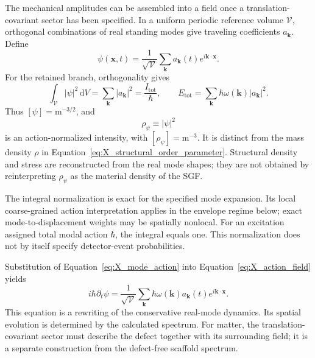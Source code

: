 The mechanical amplitudes can be assembled into a field once a translation-covariant sector has been specified. In a uniform periodic reference volume $\mathcal V$, orthogonal combinations of real standing modes give traveling coefficients $a_{\mathbf k}$. Define
\begin{equation}
    \boxed{
    \psi(\mathbf x,t)
    =\frac{1}{\sqrt{\mathcal V}}
    \sum_{\mathbf k}a_{\mathbf k}(t)e^{i\mathbf k\cdot\mathbf x}
    }.
    \label{eq:X_action_field}
\end{equation}
For the retained branch, orthogonality gives
\begin{equation}
    \int_{\mathcal V}|\psi|^2\,\mathrm dV
    =\sum_{\mathbf k}|a_{\mathbf k}|^2
    =\frac{I_{\mathrm{tot}}}{\hbar},
    \qquad
    E_{\mathrm{tot}}
    =\sum_{\mathbf k}\hbar\omega(\mathbf k)|a_{\mathbf k}|^2.
\end{equation}
Thus $[\psi]=\mathrm m^{-3/2}$, and
\begin{equation}
    \rho_\psi\equiv|\psi|^2
\end{equation}
is an action-normalized intensity, with $[\rho_\psi]=\mathrm m^{-3}$. It is distinct from the mass density $\rho$ in Equation~\eqref{eq:X_structural_order_parameter}. Structural density and stress are reconstructed from the real mode shapes; they are not obtained by reinterpreting $\rho_\psi$ as the material density of the SGF.

The integral normalization is exact for the specified mode expansion. Its local coarse-grained action interpretation applies in the envelope regime below; exact mode-to-displacement weights may be spatially nonlocal. For an excitation assigned total modal action $\hbar$, the integral equals one. This normalization does not by itself specify detector-event probabilities.

Substitution of Equation~\eqref{eq:X_mode_action} into Equation~\eqref{eq:X_action_field} yields
\begin{equation}
    i\hbar\partial_t\psi
    =\frac{1}{\sqrt{\mathcal V}}
    \sum_{\mathbf k}\hbar\omega(\mathbf k)
    a_{\mathbf k}(t)e^{i\mathbf k\cdot\mathbf x}.
    \label{eq:X_exact_spectral_evolution}
\end{equation}
This equation is a rewriting of the conservative real-mode dynamics. Its spatial evolution is determined by the calculated spectrum. For matter, the translation-covariant sector must describe the defect together with its surrounding field; it is a separate construction from the defect-free scaffold spectrum.

